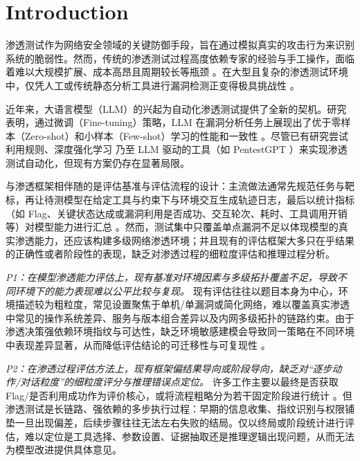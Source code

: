 \documentclass[a4paper, twocolumn]{article}
\begin{document}
% 




\section{Introduction}
渗透测试作为网络安全领域的关键防御手段，旨在通过模拟真实的攻击行为来识别系统的脆弱性。然而，传统的渗透测试过程高度依赖专家的经验与手工操作，面临着难以大规模扩展、成本高昂且周期较长等瓶颈 \cite{yang2021pentesteval}。在大型且复杂的渗透测试环境中，仅凭人工或传统静态分析工具进行漏洞检测正变得极具挑战性 \cite{beller2016analyzing}。

近年来，大语言模型（LLM）的兴起为自动化渗透测试提供了全新的契机。研究表明，通过微调（Fine-tuning）策略，LLM 在漏洞分析任务上展现出了优于零样本（Zero-shot）和小样本（Few-shot）学习的性能和一致性 \cite{sultana2026llms}。尽管已有研究尝试利用规则、深度强化学习 \cite{appelt2014automated, qiu2014automated} 乃至 LLM 驱动的工具（如 PentestGPT \cite{deng2023pentestgpt}）来实现渗透测试自动化，但现有方案仍存在显著局限。

与渗透框架相伴随的是评估基准与评估流程的设计：主流做法通常先规范任务与靶标，再让待测模型在给定工具与约束下与环境交互生成轨迹日志，最后以统计指标（如 Flag、关键状态达成或漏洞利用是否成功、交互轮次、耗时、工具调用开销等）对模型能力进行汇总 \cite{yang2021pentesteval, deng2023pentestgpt}。然而，测试集中只覆盖单点漏洞不足以体现模型的真实渗透能力，还应该构建多级网络渗透环境；并且现有的评估框架大多只在乎结果的正确性或者阶段性的表现，缺乏对渗透过程的细粒度评估和推理过程分析。

\textit{P1：在模型渗透能力评估上，现有基准对环境因素与多级拓扑覆盖不足，导致不同环境下的能力表现难以公平比较与复现。} 现有评估往往以题目本身为中心，环境描述较为粗粒度，常见设置聚焦于单机/单漏洞或简化网络，难以覆盖真实渗透中常见的操作系统差异、服务与版本组合差异以及内网多级拓扑的链路约束。由于渗透决策强依赖环境指纹与可达性，缺乏环境敏感建模会导致同一策略在不同环境中表现差异显著，从而降低评估结论的可迁移性与可复现性 \cite{yang2021pentesteval, deng2023pentestgpt}。

\textit{P2：在渗透过程评估方法上，现有框架偏结果导向或阶段导向，缺乏对“逐步动作/对话粒度”的细粒度评分与推理错误点定位。} 许多工作主要以最终是否获取 Flag/是否利用成功作为评价核心，或将流程粗略分为若干固定阶段进行统计 \cite{yang2021pentesteval}。但渗透测试是长链路、强依赖的多步执行过程：早期的信息收集、指纹识别与权限铺垫一旦出现偏差，后续步骤往往无法左右失败的结局。仅以终局或阶段统计进行评估，难以定位是工具选择、参数设置、证据抽取还是推理逻辑出现问题，从而无法为模型改进提供具体意见。
\end{document}
